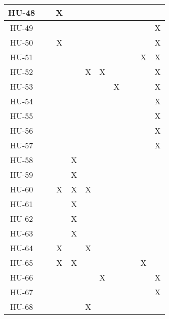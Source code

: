 \begin{table}[!ht]
\begin{tabular}{|c|c|c|c|c|c|c|c|c|c|}
        HU-48 & ~ & X & ~ & ~ & ~ & ~ & ~ & ~ & ~ \\ \hline
        HU-49 & ~ & ~ & ~ & ~ & ~ & ~ & ~ & ~ & X \\ \hline
        HU-50 & ~ & X & ~ & ~ & ~ & ~ & ~ & ~ & X \\ \hline
        HU-51 & ~ & ~ & ~ & ~ & ~ & ~ & ~ & X & X \\ \hline
        HU-52 & ~ & ~ & ~ & X & X & ~ & ~ & ~ & X \\ \hline
        HU-53 & ~ & ~ & ~ & ~ & ~ & X & ~ & ~ & X \\ \hline
        HU-54 & ~ & ~ & ~ & ~ & ~ & ~ & ~ & ~ & X \\ \hline
        HU-55 & ~ & ~ & ~ & ~ & ~ & ~ & ~ & ~ & X \\ \hline
        HU-56 & ~ & ~ & ~ & ~ & ~ & ~ & ~ & ~ & X \\ \hline
        HU-57 & ~ & ~ & ~ & ~ & ~ & ~ & ~ & ~ & X \\ \hline
        HU-58 & ~ & ~ & X & ~ & ~ & ~ & ~ & ~ & ~ \\ \hline
        HU-59 & ~ & ~ & X & ~ & ~ & ~ & ~ & ~ & ~ \\ \hline
        HU-60 & ~ & X & X & X & ~ & ~ & ~ & ~ & ~ \\ \hline
        HU-61 & ~ & ~ & X & ~ & ~ & ~ & ~ & ~ & ~ \\ \hline
        HU-62 & ~ & ~ & X & ~ & ~ & ~ & ~ & ~ & ~ \\ \hline
        HU-63 & ~ & ~ & X & ~ & ~ & ~ & ~ & ~ & ~ \\ \hline
        HU-64 & ~ & X & ~ & X & ~ & ~ & ~ & ~ & ~ \\ \hline
        HU-65 & ~ & X & X & ~ & ~ & ~ & ~ & X & ~ \\ \hline
        HU-66 & ~ & ~ & ~ & ~ & X & ~ & ~ & ~ & X \\ \hline
        HU-67 & ~ & ~ & ~ & ~ & ~ & ~ & ~ & ~ & X \\ \hline
        HU-68 & ~ & ~ & ~ & X & ~ & ~ & ~ & ~ & ~ \\ \hline
    \end{tabular}
\end{table}